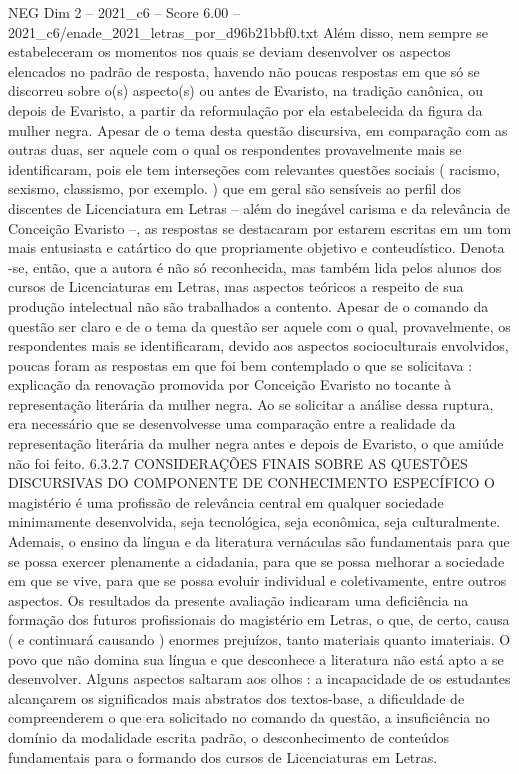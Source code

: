 \begin{textsample}{NEG Dim 2 – 2021\_c6 – Score 6.00 – 2021\_c6/enade\_2021\_letras\_por\_d96b21bbf0.txt}
Além disso, nem sempre se estabeleceram os momentos nos quais se deviam desenvolver os aspectos elencados no padrão de resposta, havendo não poucas respostas em que só se discorreu sobre o(s) aspecto(s) ou antes de Evaristo, na tradição canônica, ou depois de Evaristo, a partir da reformulação por ela estabelecida da figura da mulher negra.
Apesar de o tema desta questão discursiva, em comparação com as outras duas, ser aquele com o qual os respondentes provavelmente mais se identificaram, pois ele tem interseções com relevantes questões sociais ( racismo, sexismo, classismo, por exemplo. ) que em geral são sensíveis ao perfil dos discentes de Licenciatura em Letras – além do inegável carisma e da relevância de Conceição Evaristo –, as respostas se destacaram por estarem escritas em um tom mais entusiasta e catártico do que propriamente objetivo e conteudístico.
Denota -se, então, que a autora é não só reconhecida, mas também lida pelos alunos dos cursos de Licenciaturas em Letras, mas aspectos teóricos a respeito de sua produção intelectual não são trabalhados a contento.
Apesar de o comando da questão ser claro e de o tema da questão ser aquele com o qual, provavelmente, os respondentes mais se identificaram, devido aos aspectos socioculturais envolvidos, poucas foram as respostas em que foi bem contemplado o que se solicitava : explicação da renovação promovida por Conceição Evaristo no tocante à representação literária da mulher negra.
Ao se solicitar a análise dessa ruptura, era necessário que se desenvolvesse uma comparação entre a realidade da representação literária da mulher negra antes e depois de Evaristo, o que amiúde não foi feito. 6.3.2.7 CONSIDERAÇÕES FINAIS SOBRE AS QUESTÕES DISCURSIVAS DO COMPONENTE DE CONHECIMENTO ESPECÍFICO O magistério é uma profissão de relevância central em qualquer sociedade minimamente desenvolvida, seja tecnológica, seja econômica, seja culturalmente.
Ademais, o ensino da língua e da literatura vernáculas são fundamentais para que se possa exercer plenamente a cidadania, para que se possa melhorar a sociedade em que se vive, para que se possa evoluir individual e coletivamente, entre outros aspectos.
Os resultados da presente avaliação indicaram uma deficiência na formação dos futuros profissionais do magistério em Letras, o que, de certo, causa ( e continuará causando ) enormes prejuízos, tanto materiais quanto imateriais.
O povo que não domina sua língua e que desconhece a literatura não está apto a se desenvolver.
Alguns aspectos saltaram aos olhos : a incapacidade de os estudantes alcançarem os significados mais abstratos dos textos-base, a dificuldade de compreenderem o que era solicitado no comando da questão, a insuficiência no domínio da modalidade escrita padrão, o desconhecimento de conteúdos fundamentais para o formando dos cursos de Licenciaturas em Letras.

\end{textsample}
